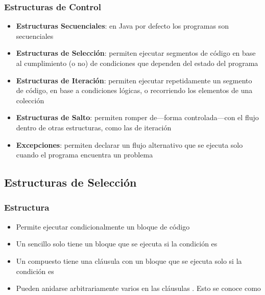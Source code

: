 \documentclass{beamer}
\begin{document}
\begin{frame}
  \frametitle{Estructuras de Control}

  \begin{small}
  \begin{itemize}
    
  \item \textbf{Estructuras Secuenciales}: en Java por defecto los programas
    son secuenciales
    
  \item \textbf{Estructuras de Selección}: permiten ejecutar segmentos de
    código en base al cumplimiento (o no) de condiciones que dependen
    del estado del programa
    
  \item \textbf{Estructuras de Iteración}: permiten ejecutar repetidamente un
    segmento de código, en base a condiciones lógicas, o recorriendo
    los elementos de una colección

    
  \item \textbf{Estructuras de Salto}: permiten romper de---forma
    controlada---con el flujo dentro de otras estructuras, como las de
    iteración
    
  \item \textbf{Excepciones}: permiten declarar un flujo alternativo
    que se ejecuta solo cuando el programa encuentra un problema
    
  \end{itemize}
  \end{small}

\end{frame}

\subsection{Estructuras de Selección}

\begin{frame}
  \frametitle{Estructura }

  \begin{itemize}
  \item Permite ejecutar condicionalmente un bloque de código
    
  \item Un  sencillo solo tiene un bloque que se ejecuta si
    la condición es 
    
  \item Un  compuesto tiene una cláusula  con un
    bloque que se ejecuta solo si la condición es 
    
  \item Pueden anidarse arbitrariamente varios  en las
    cláusulas . Esto se conoce como 
    
  \end{itemize}
\end{frame}
\end{document}
